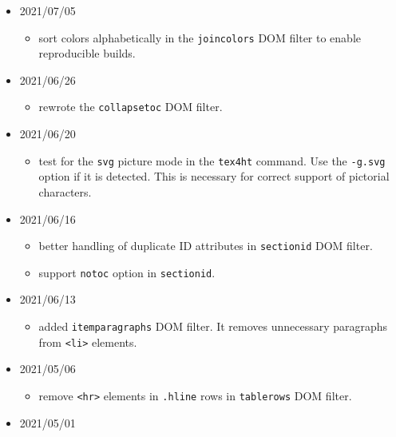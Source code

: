 \begin{itemize}
  \begin{itemize}
  \tightlist
  \item
    remove elements produced by \texttt{\textbackslash{}maketitle} in
    the \texttt{staticsite} extension.
  \end{itemize}
\item
  2021/07/05

  \begin{itemize}
  \tightlist
  \item
    sort colors alphabetically in the \texttt{joincolors} DOM filter to
    enable reproducible builds.
  \end{itemize}
\item
  2021/06/26

  \begin{itemize}
  \tightlist
  \item
    rewrote the \texttt{collapsetoc} DOM filter.
  \end{itemize}
\item
  2021/06/20

  \begin{itemize}
  \tightlist
  \item
    test for the \texttt{svg} picture mode in the \texttt{tex4ht}
    command. Use the \texttt{-g.svg} option if it is detected. This is
    necessary for correct support of pictorial characters.
  \end{itemize}
\item
  2021/06/16

  \begin{itemize}
  \tightlist
  \item
    better handling of duplicate ID attributes in \texttt{sectionid} DOM
    filter.
  \item
    support \texttt{notoc} option in \texttt{sectionid}.
  \end{itemize}
\item
  2021/06/13

  \begin{itemize}
  \tightlist
  \item
    added \texttt{itemparagraphs} DOM filter. It removes unnecessary
    paragraphs from \texttt{\textless{}li\textgreater{}} elements.
  \end{itemize}
\item
  2021/05/06

  \begin{itemize}
  \tightlist
  \item
    remove \texttt{\textless{}hr\textgreater{}} elements in
    \texttt{.hline} rows in \texttt{tablerows} DOM filter.
  \end{itemize}
\item
  2021/05/01


\end{itemize}

